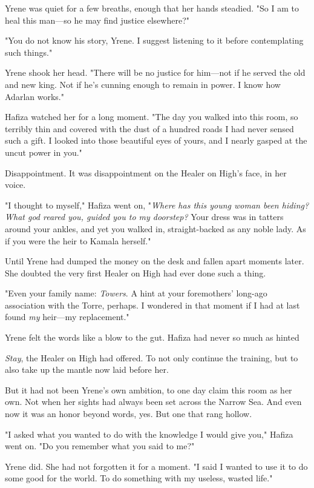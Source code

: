 Yrene was quiet for a few breaths, enough that her hands steadied. "So I am to heal this man---so he may find justice elsewhere?"

"You do not know his story, Yrene. I suggest listening to it before contemplating such things."

Yrene shook her head. "There will be no justice for him---not if he served the old and new king. Not if he's cunning enough to remain in power. I know how Adarlan works."

Hafiza watched her for a long moment. "The day you walked into this room, so terribly thin and covered with the dust of a hundred roads I had never sensed such a gift. I looked into those beautiful eyes of yours, and I nearly gasped at the uncut power in you."

Disappointment. It was disappointment on the Healer on High's face, in her voice.

"I thought to myself," Hafiza went on, "\emph{Where has this young woman been hiding? What god reared you, guided you to my doorstep?} Your dress was in tatters around your ankles, and yet you walked in, straight-backed as any noble lady. As if you were the heir to Kamala herself."

Until Yrene had dumped the money on the desk and fallen apart moments later. She doubted the very first Healer on High had ever done such a thing.

"Even your family name: \emph{Towers}. A hint at your foremothers' long-ago association with the Torre, perhaps. I wondered in that moment if I had at last found \emph{my} heir---my replacement."

Yrene felt the words like a blow to the gut. Hafiza had never so much as hinted 

\emph{Stay}, the Healer on High had offered. To not only continue the training, but to also take up the mantle now laid before her.

But it had not been Yrene's own ambition, to one day claim this room as her own. Not when her sights had always been set across the Narrow Sea. And even now  it was an honor beyond words, yes. But one that rang hollow.

"I asked what you wanted to do with the knowledge I would give you," Hafiza went on. "Do you remember what you said to me?"

Yrene did. She had not forgotten it for a moment. "I said I wanted to use it to do some good for the world. To do something with my useless, wasted life."

